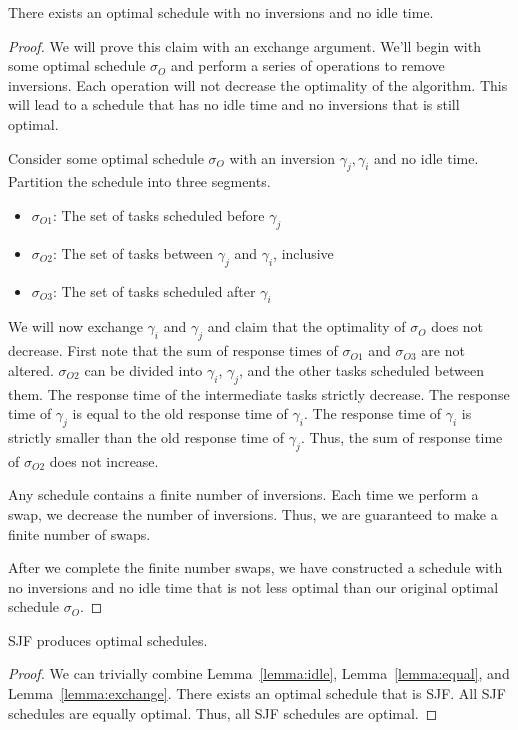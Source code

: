 \documentclass{hw}
\begin{document}
\begin{lemma}\label{lemma:exchange}
There exists an optimal schedule with no inversions and no idle time.
\begin{proof}
We will prove this claim with an exchange argument. We'll begin with some
optimal schedule $\sigma_O$ and perform a series of operations to remove
inversions.  Each operation will not decrease the optimality of the algorithm.
This will lead to a schedule that has no idle time and no inversions that is
still optimal. 

Consider some optimal schedule $\sigma_O$ with an inversion $\gamma_j,
\gamma_i$ and no idle time.  Partition the schedule into three segments.
\begin{itemize}
  \item $\sigma_{O1}$: The set of tasks scheduled before $\gamma_j$
  \item $\sigma_{O2}$: The set of tasks between $\gamma_j$ and $\gamma_i$,
    inclusive
  \item $\sigma_{O3}$: The set of tasks scheduled after $\gamma_i$
\end{itemize}

We will now exchange $\gamma_i$ and $\gamma_j$ and claim that the optimality of
$\sigma_O$ does not decrease. First note that the sum of response times of
$\sigma_{O1}$ and $\sigma_{O3}$ are not altered. $\sigma_{O2}$ can be divided
into $\gamma_i$, $\gamma_j$, and the other tasks scheduled between them. The
response time of the intermediate tasks strictly decrease. The response time of
$\gamma_j$ is equal to the old response time of $\gamma_i$. The response time
of $\gamma_i$ is strictly smaller than the old response time of $\gamma_j$.
Thus, the sum of response time of $\sigma_{O2}$ does not increase. 

Any schedule contains a finite number of inversions. Each time we perform a
swap, we decrease the number of inversions. Thus, we are guaranteed to make a
finite number of swaps.

After we complete the finite number swaps, we have constructed a schedule with
no inversions and no idle time that is not less optimal than our original
optimal schedule $\sigma_O$.
\end{proof}
\end{lemma}

\begin{claim}
SJF produces optimal schedules.
\begin{proof}
We can trivially combine Lemma~\ref{lemma:idle}, Lemma~\ref{lemma:equal}, and
Lemma~\ref{lemma:exchange}. There exists an optimal schedule that is SJF\@. All
SJF schedules are equally optimal. Thus, all SJF schedules are optimal.
\end{proof}
\end{claim}
\end{document}
